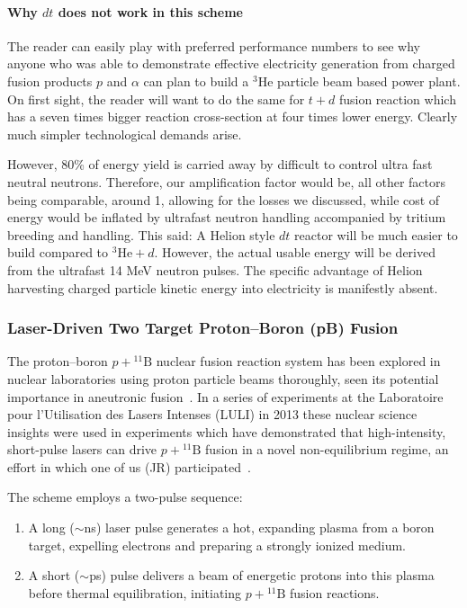 \documentclass[particles,article,accept,pdftex,moreauthors]{Definitions/mdpi}
\begin{document}
\paragraph*{\bf Why $dt$ does not work in this scheme}
The reader can easily play with preferred performance numbers to see why anyone who was able to demonstrate effective electricity generation from charged fusion products $p$ and $\alpha$ can plan to build a ${}^3\mathrm{He}$ particle beam based power plant. On first sight, the reader will want to do the same for $t+d$ fusion reaction which has a seven times bigger reaction cross-section at four times lower energy. Clearly much simpler technological demands arise.

However, 80\% of energy yield is carried away by difficult to control ultra fast neutral neutrons. Therefore, our amplification factor would be, all other factors being comparable, around 1, allowing for the losses we discussed, while cost of energy would be inflated by ultrafast neutron handling accompanied by tritium breeding and handling. This said: A Helion style $dt$ reactor will be much easier to build compared to ${}^3\mathrm{He}+d$. However, the actual usable energy will be derived from the ultrafast 14 MeV neutron pulses. The specific advantage of Helion harvesting charged particle kinetic energy into electricity is manifestly absent.

\subsubsection{Laser-Driven Two Target Proton--Boron (pB) Fusion}\label{sssec:LULIpB}
The proton--boron $p+{}^{11}\mathrm{B}$ nuclear fusion reaction system has been explored in nuclear laboratories using proton particle beams thoroughly, seen its potential importance in aneutronic fusion~\cite{Stave:2011zz,Sikora:2016pB}. In a series of experiments at the Laboratoire pour l'Utilisation des Lasers Intenses (LULI) in 2013 these nuclear science insights were used in experiments which have demonstrated that high-intensity, short-pulse lasers can drive $p+{}^{11}\mathrm{B}$ fusion in a novel non-equilibrium regime, an effort in which one of us (JR) participated~\cite{Labaune:2013dla}.

The scheme employs a two-pulse sequence:
\begin{enumerate}
\item A long ($\sim$ns) laser pulse generates a hot, expanding plasma from a boron target, expelling electrons and preparing a strongly ionized medium.
\item A short ($\sim$ps) pulse delivers a beam of energetic protons into this plasma before thermal equilibration, initiating $p+{}^{11}\mathrm{B}$ fusion reactions.
\end{enumerate}
\end{document}
